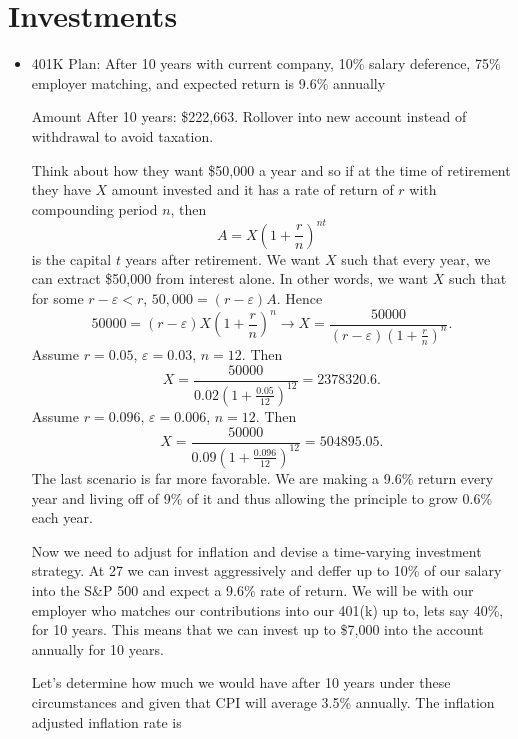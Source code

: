 \documentclass[leqno]{article}
\theoremstyle{definition}
\theoremstyle{remark}
\begin{document}
\section{Investments}
    \begin{itemize}
        \item 401K Plan: After 10 years with current company, 10\% salary deference, 75\% employer matching, and expected return is 9.6\% annually\par Amount After 10 years: \$222,663. Rollover into new account instead of withdrawal to avoid taxation. \par\hspace{4mm} Think about how they want \$50,000 a year and so if at the time of retirement they have $X$ amount invested and it has a rate of return of $r$ with compounding period $n$, then 
            \begin{equation*}
                A=X\left(1+\frac{r}{n}\right)^{nt}
            \end{equation*}
        is the capital $t$ years after retirement. We want $X$ such that every year, we can extract \$50,000 from interest alone. In other words, we want $X$ such that for some $r-\varepsilon<r$, $50,000=(r-\varepsilon)A$. Hence
            \begin{equation*}
                50000=(r-\varepsilon)X\left(1+\frac{r}{n}\right)^{n} 
                \rightarrow X=\frac{50000}{(r-\varepsilon)\left(1+\frac{r}{n}\right)^n}.
            \end{equation*}
        Assume $r=0.05$, $\varepsilon=0.03$, $n=12$. Then 
            \begin{equation*}
                X=\frac{50000}{0.02\left(1+\frac{0.05}{12}\right)^{12}}=2378320.6.
            \end{equation*}
        Assume $r=0.096$, $\varepsilon=0.006$, $n=12$. Then 
            \begin{equation*}
                X=\frac{50000}{0.09\left(1+\frac{0.096}{12}\right)^{12}}=504895.05.
            \end{equation*}
        The last scenario is far more favorable. We are making a 9.6\% return every year and living off of 9\% of it and thus allowing the principle to grow 0.6\% each year.\par\hspace{4mm} Now we need to adjust for inflation and devise a time-varying investment strategy. At 27 we can invest aggressively and deffer up to 10\% of our salary into the S\&P 500 and expect a 9.6\% rate of return. We will be with our employer who matches our contributions into our 401(k) up to, lets say 40\%, for 10 years. This means that we can invest up to \$7,000 into the account annually for 10 years.\par\hspace{4mm} Let's determine how much we would have after 10 years under these circumstances and given that CPI will average 3.5\% annually. The inflation adjusted inflation rate is

\end{itemize}
\end{document}
